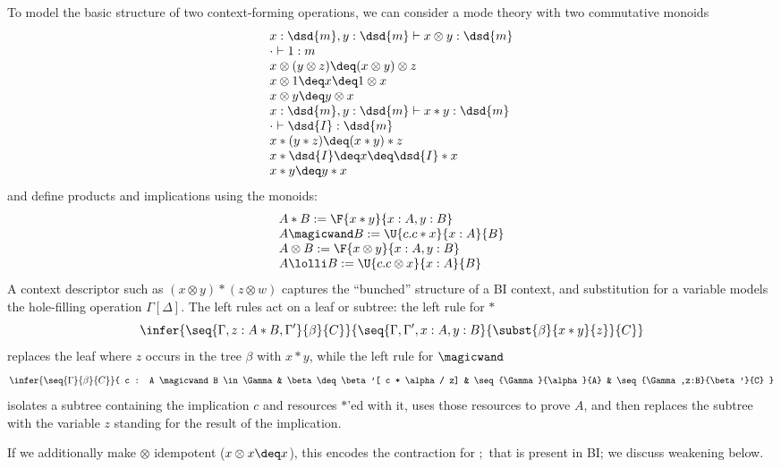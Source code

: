 To model the basic structure of two context-forming operations, we can
consider a mode theory with two commutative monoids
\[
\begin{array}{l}
x  : \dsd{m}, y  : \dsd{m} \vdash x \otimes y : \dsd{m} \\
\cdot \vdash 1 : m \\
x \otimes (y \otimes z) \deq (x \otimes y) \otimes z\\
x \otimes 1 \deq x \deq 1 \otimes x\\
x \otimes y \deq y \otimes x \\
x  : \dsd{m}, y  : \dsd{m} \vdash x * y : \dsd{m} \\
\cdot \vdash \dsd{I} : \dsd{m} \\
x * (y * z) \deq (x * y) * z\\
x * \dsd{I} \deq x \deq \dsd{I} * x\\
x * y \deq y * x \\
\end{array}
\]
and define products and implications using the monoids:
\[
\begin{array}{l}
A * B := \F{x * y}{x : A, y : B} \\
A \magicwand B := \U{c.c * x}{x : A}{B} \\
A \otimes B := \F{x \otimes y}{x : A, y : B}\\
A \lolli B := \U{c.c \otimes x}{x : A}{B}\\
\end{array}
\]
A context descriptor such as $(x \otimes y) * (z \otimes w)$ captures
the ``bunched'' structure of a BI context, and substitution for a
variable models the hole-filling operation $\Gamma[\Delta]$.  The left
rules act on a leaf or subtree: the left rule for $*$
\[
\infer{\seq{\Gamma,z:A*B,\Gamma'}{\beta}{C}}
      {\seq{\Gamma,\Gamma',x:A,y:B}{\subst{\beta}{x * y}{z}}{C}}
\]
replaces the leaf where $z$ occurs in the tree $\beta$ with $x*y$, while
the left rule for $\magicwand$
\[
\infer{\seq{\Gamma}{\beta}{C}}
      {
        c : A \magicwand B \in \Gamma &
        \beta \deq \beta'[ c * \alpha / z] & 
        \seq{\Gamma}{\alpha}{A} &
        \seq{\Gamma,z:B}{\beta'}{C} 
      }
\]
isolates a subtree containing the implication $c$ and resources $*$'ed
with it, uses those resources to prove $A$, and then replaces the
subtree with the variable $z$ standing for the result of the
implication.

If we additionally make $\otimes$ idempotent ($x \otimes x \deq x$),
this encodes the contraction for $;$ that is present in BI; we discuss
weakening below.

